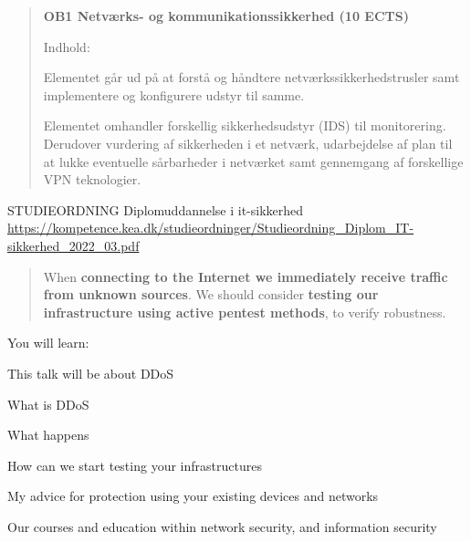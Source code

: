 \documentclass[Screen16to9,17pt]{foils}
\begin{document}
{}


\hlkprofil






\begin{quote}
{\bf OB1 Netværks- og kommunikationssikkerhed (10 ECTS)}

Indhold:

Elementet går ud på at forstå og håndtere netværkssikkerhedstrusler samt implementere og
konfigurere udstyr til samme.

Elementet omhandler forskellig sikkerhedsudstyr (IDS) til monitorering. Derudover vurdering
af sikkerheden i et netværk, udarbejdelse af plan til at lukke eventuelle sårbarheder i
netværket samt gennemgang af forskellige VPN teknologier.
\end{quote}

STUDIEORDNING Diplomuddannelse i it-sikkerhed\\
{\footnotesize
\url{https://kompetence.kea.dk/studieordninger/Studieordning_Diplom_IT-sikkerhed_2022_03.pdf}}





\begin{quote}
When {\bf connecting to the Internet we immediately receive traffic from unknown sources}. We should consider {\bf testing our infrastructure using active pentest methods}, to verify robustness.
\end{quote}


You will learn:
\begin{list2}
\item This talk will be about DDoS
\item What is DDoS
\item What happens
\item How can we start testing your infrastructures
\item My advice for protection using your existing devices and networks
\item Our courses and education within network security, and information security
\end{list2}
\end{document}
